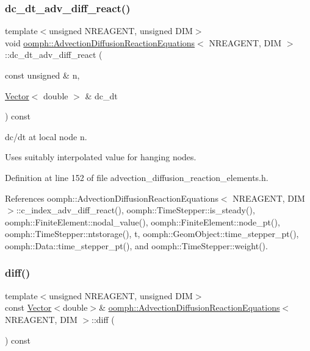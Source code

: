 \subsubsection{\texorpdfstring{dc\+\_\+dt\+\_\+adv\+\_\+diff\+\_\+react()}{dc\_dt\_adv\_diff\_react()}\hspace{0.1cm}{\footnotesize\ttfamily [2/2]}}
{\footnotesize\ttfamily template$<$unsigned N\+R\+E\+A\+G\+E\+NT, unsigned D\+IM$>$ \\
void \hyperlink{classoomph_1_1AdvectionDiffusionReactionEquations}{oomph\+::\+Advection\+Diffusion\+Reaction\+Equations}$<$ N\+R\+E\+A\+G\+E\+NT, D\+IM $>$\+::dc\+\_\+dt\+\_\+adv\+\_\+diff\+\_\+react (\begin{DoxyParamCaption}\item[{const unsigned \&}]{n,  }\item[{\hyperlink{classoomph_1_1Vector}{Vector}$<$ double $>$ \&}]{dc\+\_\+dt }\end{DoxyParamCaption}) const\hspace{0.3cm}{\ttfamily [inline]}}



dc/dt at local node n. 

Uses suitably interpolated value for hanging nodes. 

Definition at line 152 of file advection\+\_\+diffusion\+\_\+reaction\+\_\+elements.\+h.



References oomph\+::\+Advection\+Diffusion\+Reaction\+Equations$<$ N\+R\+E\+A\+G\+E\+N\+T, D\+I\+M $>$\+::c\+\_\+index\+\_\+adv\+\_\+diff\+\_\+react(), oomph\+::\+Time\+Stepper\+::is\+\_\+steady(), oomph\+::\+Finite\+Element\+::nodal\+\_\+value(), oomph\+::\+Finite\+Element\+::node\+\_\+pt(), oomph\+::\+Time\+Stepper\+::ntstorage(), t, oomph\+::\+Geom\+Object\+::time\+\_\+stepper\+\_\+pt(), oomph\+::\+Data\+::time\+\_\+stepper\+\_\+pt(), and oomph\+::\+Time\+Stepper\+::weight().

\mbox{\label{classoomph_1_1AdvectionDiffusionReactionEquations_ad59a0d4f89e443358553e4802233dc1d}} 
\subsubsection{\texorpdfstring{diff()}{diff()}}
{\footnotesize\ttfamily template$<$unsigned N\+R\+E\+A\+G\+E\+NT, unsigned D\+IM$>$ \\
const \hyperlink{classoomph_1_1Vector}{Vector}$<$double$>$\& \hyperlink{classoomph_1_1AdvectionDiffusionReactionEquations}{oomph\+::\+Advection\+Diffusion\+Reaction\+Equations}$<$ N\+R\+E\+A\+G\+E\+NT, D\+IM $>$\+::diff (\begin{DoxyParamCaption}{ }\end{DoxyParamCaption}) const\hspace{0.3cm}{\ttfamily [inline]}}



